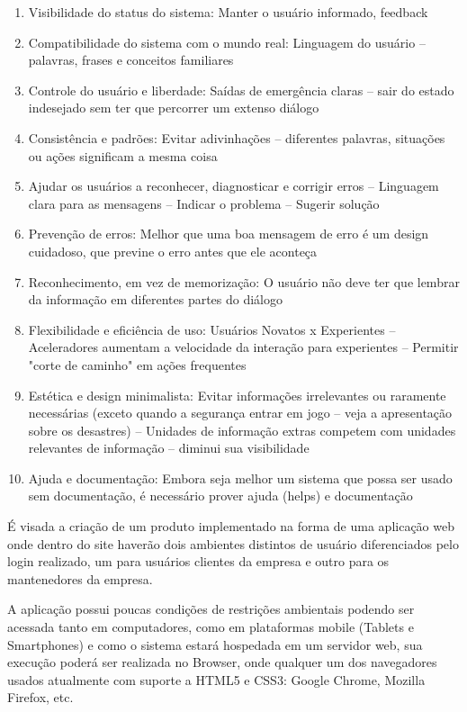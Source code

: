 \begin{enumerate}
	\item Visibilidade do status do sistema: Manter o usuário informado, feedback
	\item Compatibilidade do sistema com o mundo real: Linguagem do usuário -- palavras, frases e conceitos familiares 
	\item Controle do usuário e liberdade: Saídas de emergência claras -- sair do estado indesejado sem ter que percorrer um extenso diálogo
	\item Consistência e padrões: Evitar adivinhações -- diferentes palavras, situações ou ações significam a mesma coisa
	\item Ajudar os usuários a reconhecer, diagnosticar e corrigir erros -- Linguagem clara para as mensagens -- Indicar o problema -- Sugerir solução 
	\item Prevenção de erros: Melhor que uma boa mensagem de erro é um design cuidadoso, que previne o erro antes que ele aconteça
	\item Reconhecimento, em vez de memorização: O usuário não deve ter que lembrar da informação em diferentes partes do diálogo 
	\item Flexibilidade e eficiência de uso: Usuários Novatos x Experientes -- Aceleradores aumentam a velocidade da interação para experientes -- Permitir "corte de caminho" em ações frequentes 
	\item Estética e design minimalista: Evitar informações irrelevantes ou raramente necessárias (exceto quando a segurança entrar em jogo -- veja a apresentação sobre os desastres) -- Unidades de informação extras competem com unidades relevantes de informação -- diminui sua visibilidade 
	\item Ajuda e documentação: Embora seja melhor um sistema que possa ser usado sem documentação, é necessário prover ajuda (helps) e documentação
\end{enumerate}

É visada a criação de um produto implementado na forma de uma aplicação web onde dentro do site haverão dois ambientes distintos de usuário diferenciados pelo login realizado, um para usuários clientes da empresa e outro para os mantenedores da empresa.

A aplicação possui poucas condições de restrições ambientais podendo ser acessada tanto em computadores, como em plataformas mobile (Tablets e Smartphones) e como o sistema estará hospedada em um servidor web, sua execução poderá ser realizada no Browser, onde qualquer um dos navegadores usados atualmente com suporte a HTML5 e CSS3: Google Chrome, Mozilla Firefox, etc.

